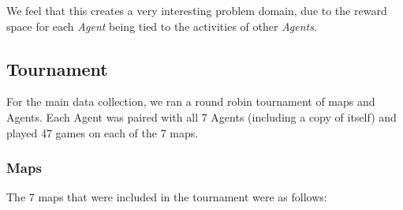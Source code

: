\documentclass{IEEEtran}
\begin{document}
We feel that this creates a very interesting problem domain, due to the reward space for each \emph{Agent} being tied to the activities of other \emph{Agents}.

\subsection{Tournament}
For the main data collection, we ran a round robin tournament of maps and Agents. Each Agent was paired with all 7 Agents (including a copy of itself) and played 47 games on each of the 7 maps. 

\subsubsection{Maps}
The 7 maps that were included in the tournament were as follows:
\end{document}
